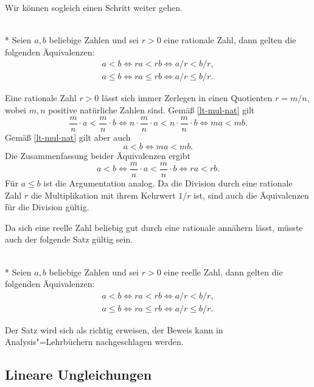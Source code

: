Wir können sogleich einen Schritt weiter gehen.
\begin{Satz}\mbox{}\\*
Seien $a,b$ beliebige Zahlen und sei $r>0$ eine rationale Zahl,
dann gelten die folgenden Äquivalenzen:
\begin{gather}
\label{lt-mul-rat} a<b\iff ra<rb\iff a/r<b/r,\\
\label{lt-mul-rat} a\le b\iff ra\le rb\iff a/r\le b/r.
\end{gather}
\end{Satz}

\noindent{}
Eine rationale Zahl $r>0$ lässt sich immer Zerlegen in einen Quotienten
$r=m/n$, wobei $m,n$ positive natürliche Zahlen sind. Gemäß
\eqref{lt-mul-nat} gilt
\begin{equation}
\frac{m}{n}\cdot a<\frac{m}{n}\cdot b
\iff n\cdot\frac{m}{n}\cdot a<n\cdot\frac{m}{n}\cdot b
\iff ma<mb.
\end{equation}
Gemäß \eqref{lt-mul-nat} gilt aber auch
\begin{equation}
a<b\iff ma<mb.
\end{equation}
Die Zusammenfassung beider Äquivalenzen ergibt
\begin{equation}
a<b\iff \frac{m}{n}\cdot a<\frac{m}{n}\cdot b\iff ra<rb.
\end{equation}
Für $a\le b$ ist die Argumentation analog. Da die Division durch
eine rationale Zahl $r$ die Multiplikation mit ihrem Kehrwert $1/r$ ist,
sind auch die Äquivalenzen für die Division gültig.\;\qedsymbol

Da sich eine reelle Zahl beliebig gut durch eine rationale annähern
lässt, müsste auch der folgende Satz gültig sein.

\begin{Satz}\mbox{}\\*
Seien $a,b$ beliebige Zahlen und sei $r>0$ eine reelle Zahl,
dann gelten die folgenden Äquivalenzen:
\begin{gather}
\label{lt-mul-real} a<b\iff ra<rb\iff a/r<b/r,\\
\label{lt-mul-real} a\le b\iff ra\le rb\iff a/r\le b/r.
\end{gather}
\end{Satz}

\noindent
Der Satz wird sich als richtig erweisen, der Beweis kann in
Analysis"=Lehrbüchern nachgeschlagen werden.

\subsection{Lineare Ungleichungen}

